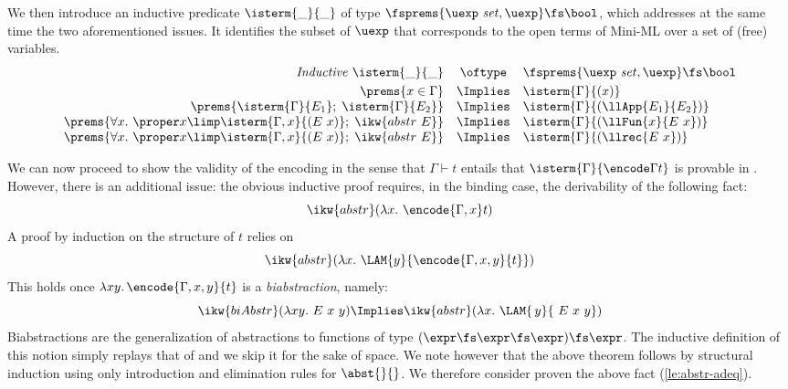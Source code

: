 \documentclass[final]{svjour3}
\begin{document}
We then introduce an inductive predicate ${\isterm{\_}{\_}}$ of type
$\fsprems{\uexp\ \mathit{set},\uexp} \fs \bool$, which 
addresses at the same time the two aforementioned issues. It
identifies the subset of $\uexp$ that corresponds to the open terms of
Mini-ML over a set of (free) variables.
 \[
 \begin{array}{rcl}
 \mathit{Inductive}\ \isterm{\_}{\_} &\oftype &\fsprems{\uexp\ \mathit{set},\uexp} \fs \bool\\[1mm]
\prems{x\in\Gamma}   & \Implies & \isterm{\Gamma}{({x})} \\
   \prems{\isterm{\Gamma}{E_1} ;\; \isterm{\Gamma}{E_2}} & \Implies &  
   \isterm{\Gamma} {(\llApp{E_1}{E_2})}\\ 
    \prems{\forall x.\ \proper x \limp\isterm{\Gamma,x}{(E~x)};
      \; \ikw{abstr\ E }}& \Implies & 
    \isterm{\Gamma}{(\llFun{x}{E\ x})} \\
    \prems{\forall x.\ \proper x \limp\isterm{\Gamma,x}{(E~x)};
      \; \ikw{abstr\ E }}& \Implies & 
    \isterm{\Gamma}{(\llrec{E\ x})} 
 \end{array}
\]

We can now proceed to show the validity of the encoding in the sense that
$\Gamma\vdash t$ entails that $\isterm{\Gamma}{\encode \Gamma t}$ is
provable in \HOL. However, there is an additional issue: the obvious
inductive proof requires, in the binding case, the derivability of the
following fact:
\begin{equation}
\label{le:abstr-adeq}
\ikw{abstr} (\lambda x.\ \encode{\Gamma,x} t ) 
\end{equation}
A proof by induction on the structure of $t$ relies on
$$ \ikw{abstr} (\lambda x.\ \LAM{y}{\encode{\Gamma,x,y}{t}})$$
This holds once $\lambda x y.\, \encode{\Gamma,x,y}{t}$ is a
\emph{biabstraction},  namely:
$$
\ikw{biAbstr} (\lambda xy.\ {E\ x \ y})  \Implies \ikw{abstr} (\lambda
x.\ \LAM{\, y }{\ E\ x \ y}) 
$$ Biabstractions are the generalization of abstractions to
functions of type $(\expr\fs\expr\fs\expr)\fs\expr$.  The inductive
definition of this notion simply replays that of  and we
skip it for the sake of space. We note however that the above theorem
follows by structural induction using only introduction
     and elimination rules for $\abst{}{} $.
 We therefore consider proven the above fact (\ref{le:abstr-adeq}). 
\end{document}
